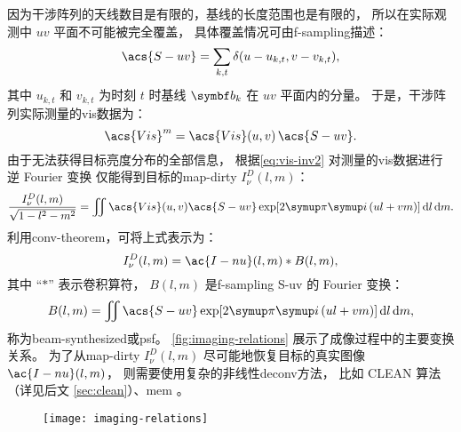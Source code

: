 因为干涉阵列的天线数目是有限的，基线的长度范围也是有限的，
所以在实际观测中 $uv$ 平面不可能被完全覆盖，
具体覆盖情况可由\acf{f-sampling}描述：
\begin{equation}
  \label{eq:sf}
  \acs{S-uv} = \sum_{k,t} \delta(u - u_{k,t}, v - v_{k,t}) ,
\end{equation}
其中 $u_{k,t}$ 和 $v_{k,t}$ 为时刻 $t$ 时基线 $\B{b}_k$ 在 $uv$ 平面内的分量。
于是，干涉阵列实际测量的\ac{vis}数据为：
\begin{equation}
  \label{eq:vis-measured}
  \acs{Vis}^{m} = \acs{Vis}(u,v) \,\acs{S-uv} .
\end{equation}
由于无法获得目标亮度分布的全部信息，
根据\autoref{eq:vis-inv2} 对测量的\ac{vis}数据进行逆 Fourier 变换
仅能得到目标的\acf{map-dirty} $I_{\nu}^D(l,m)$：
\begin{equation}
  \label{eq:dirty-map}
  \frac{I_{\nu}^D(l,m)}{\sqrt{1-l^2-m^2}} = \iint
    \acs{Vis}(u,v) \acs{S-uv} \exp [2\Cpi\Ci\, (ul+vm)] \,\D{l}\,\D{m} .
\end{equation}
利用\ac{conv-theorem}，可将上式表示为：
\begin{equation}
  I_{\nu}^D(l,m) = \ac{I-nu}(l,m) * B(l,m) ,
\end{equation}
其中 \enquote{$*$} 表示卷积算符，
$B(l, m)$ 是\ac{f-sampling} \acs{S-uv} 的 Fourier 变换：
\begin{equation}
  \label{eq:syn-beam}
  B(l,m) = \iint \acs{S-uv} \exp [2\Cpi\Ci\, (ul+vm)] \,\D{l}\,\D{m} ,
\end{equation}
称为\acf{beam-synthesized}或\acf{psf}。
\autoref{fig:imaging-relations} 展示了成像过程中的主要变换关系。
为了从\ac{map-dirty} $I_{\nu}^D(l,m)$ 尽可能地恢复目标的真实图像 $\ac{I-nu}(l,m)$，
则需要使用复杂的非线性\ac{deconv}方法，
比如 CLEAN 算法 \cite{hogbom1974,cornwell1999}
（详见后文 \autoref{sec:clean}）、\ac{mem} \cite{narayan1986}。

\begin{figure}[htp]
  \centering
  \texttt{[image: imaging-relations]}
  \label{fig:imaging-relations}
\end{figure}


